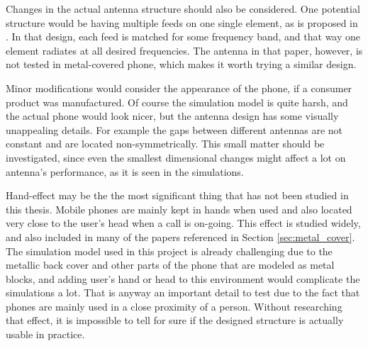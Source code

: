 Changes in the actual antenna structure should also be considered. One potential structure would be having multiple feeds on one single element, as is proposed in \cite{valkonen_multifeed}. In that design, each feed is matched for some frequency band, and that way one element radiates at all desired frequencies. The antenna in that paper, however, is not tested in metal-covered phone, which makes it worth trying a similar design.

Minor modifications would consider the appearance of the phone, if a consumer product was manufactured. Of course the simulation model is quite harsh, and the actual phone would look nicer, but the antenna design has some visually unappealing details. For example the gaps between different antennas are not constant and are located non-symmetrically. This small matter should be investigated, since even the smallest dimensional changes might affect a lot on antenna's performance, as it is seen in the simulations.

Hand-effect may be the the most significant thing that has not been studied in this thesis. Mobile phones are mainly kept in hands when used and also located very close to the user's head when a call is on-going. This effect is studied widely, and also included in many of the papers referenced in Section \ref{sec:metal_cover}. The simulation model used in this project is already challenging due to the metallic back cover and other parts of the phone that are modeled as metal blocks, and adding user's hand or head to this environment would complicate the simulations a lot. That is anyway an important detail to test due to the fact that phones are mainly used in a close proximity of a person. Without researching that effect, it is impossible to tell for sure if the designed structure is actually usable in practice.


\clearpage